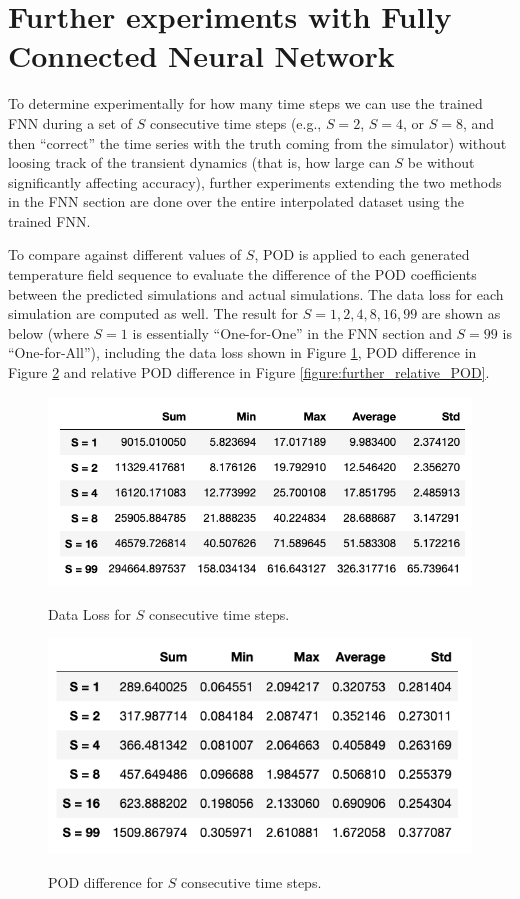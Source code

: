 \section{Further experiments with Fully Connected Neural Network}

To determine experimentally for how many time steps we can use the trained FNN during a set of $S$ consecutive time steps (e.g., $S=2$, $S=4$, or $S=8$, and then ``correct'' the time series with the truth coming from the simulator) without loosing track of the transient dynamics (that is, how large can $S$ be without significantly affecting accuracy), further experiments extending the two methods in the FNN section are done over the entire interpolated dataset using the trained FNN.

To compare against different values of $S$, POD is applied to each generated temperature field sequence to evaluate the difference of the POD coefficients between the predicted simulations and actual simulations. The data loss for each simulation are computed as well. The result for $S = 1, 2, 4, 8, 16, 99$ are shown as below (where $S=1$ is essentially ``One-for-One'' in the FNN section and $S=99$ is ``One-for-All''), including the data loss shown in Figure \ref{figure:further_loss}, POD difference in Figure \ref{figure:further_POD} and relative POD difference in Figure \ref{figure:further_relative_POD}.

\begin{figure}[H]
    \caption{Data Loss for $S$ consecutive time steps.}
    \includegraphics[scale=0.7]{figures/mantle_convection_images/further_testings/Data_Loss_table.png}
    \label{figure:further_loss}
\end{figure}

\begin{figure}[H]
    \caption{POD difference for $S$ consecutive time steps.}
    \includegraphics[scale=0.7]{figures/mantle_convection_images/further_testings/POD_table.png}
    \label{figure:further_POD}
\end{figure}

